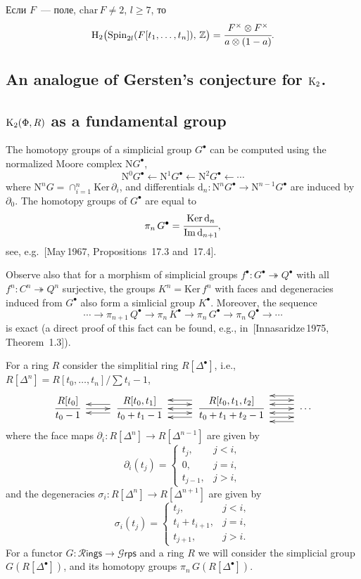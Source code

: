 \documentclass[oneside, 11pt]{amsart}
\begin{document}
\begin{corollary}
Если $F$~--- поле, $\mathrm{char}\,F\neq2$, $l\geq7$, то
$$
\mathrm H_2\big(\mathrm{Spin}_{2l}(F[t_1,\ldots,t_n]),\,\mathbb Z\big)=\cfrac{F^\times\otimes F^\times}{a\otimes(1-a)}.
$$
\end{corollary}
\subsection{An analogue of Gersten's conjecture for ${\mathrm{K}}_2$.}

\subsection{${\mathrm{K}}_2(\Phi, R)$ as a fundamental group}
The homotopy groups of a simplicial group $G^\bullet$ can be computed using the normalized Moore complex $\mathrm NG^\bullet$,
$$
\mathrm N^0G^\bullet\leftarrow\mathrm N^1G^\bullet\leftarrow\mathrm N^2G^\bullet\leftarrow\cdots
$$
where $\mathrm N^nG=\cap_{i=1}^n\mathrm{Ker}\,\partial_i$, and differentials $\mathrm d_n\colon\mathrm N^{n}G^\bullet\rightarrow\mathrm N^{n-1}G^\bullet$ are induced by $\partial_0$. The homotopy groups of $G^\bullet$ are equal to
$$
\pi_n\,G^\bullet = \cfrac{\mathrm{Ker}\,\mathrm d_n}{\mathrm{Im}\,\mathrm d_{n+1}},
$$
see, e.g.~[May\,1967, Propositions~17.3 and~17.4].

Observe also that for a morphism of simplicial groups $f^\bullet\colon G^\bullet\twoheadrightarrow Q^\bullet$ with all $f^n\colon C^n\twoheadrightarrow Q^n$ surjective, the groups $K^n=\mathrm{Ker}\,f^n$ with faces and degeneracies induced from $G^\bullet$ also form a simlicial group $K^\bullet$. Moreover, the sequence
$$
\cdots\rightarrow\pi_{n+1}\,Q^\bullet\rightarrow\pi_n\,K^\bullet\rightarrow\pi_n\,G^\bullet\rightarrow\pi_n\,Q^\bullet\rightarrow\cdots
$$
is exact (a direct proof of this fact can be found, e.g., in~[Innasaridze\,1975, Theorem~1.3]).

For a ring $R$ consider the simplitial ring $R[\Delta^\bullet]$, i.e., $R[\Delta^n]=R[t_0,\ldots,t_n]/\sum t_i-1$, 
$$
\xymatrix{
\cfrac{R[t_0]}{t_0-1}\ \ar[r]&\ar@<1ex>[l]\ar@<-1ex>[l]\ \cfrac{R[t_0,t_1]}{t_0+t_1-1}\ \ar@<1ex>[r]\ar@<-1ex>[r]&\ar@<2ex>[l]\ar@<-2ex>[l]\ar[l]\ \cfrac{R[t_0,t_1,t_2]}{t_0+t_1+t_2-1}\ \ar[r]\ar@<2ex>[r]\ar@<-2ex>[r]&\ar@<1ex>[l]\ar@<-1ex>[l]\ar@<3ex>[l]\ar@<-3ex>[l]\ \cdots
}
$$
where the face maps $\partial_i\colon R[\Delta^n]\rightarrow R[\Delta^{n-1}]$ are given by 
$$
\partial_i(t_j)=
\begin{cases}
t_j,&j<i,\\
0,&j=i,\\
t_{j-1},&j>i,
\end{cases}
$$ 
and the degeneracies $\sigma_i\colon R[\Delta^n]\rightarrow R[\Delta^{n+1}]$ are given by
$$
\sigma_i(t_j)=
\begin{cases}
t_j,&j<i,\\
t_i+t_{i+1},&j=i,\\
t_{j+1},&j>i.
\end{cases}
$$
For a functor $G\colon\mathcal R\mathsf{ings}\rightarrow\mathcal G\mathsf{rps}$ and a ring $R$ we will consider the simplicial group $G(R[\Delta^\bullet])$, and its homotopy groups $\pi_n\,G(R[\Delta^\bullet])$. 
\end{document}
